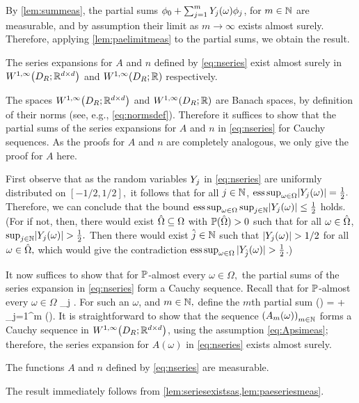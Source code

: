 By \cref{lem:summeas}, the partial sums $\phi_0 + \sum_{j=1}^m Y_{j}(\omega)\phi_j$, for $m \in \mathbb N$ are measurable, and by assumption their limit as $m \rightarrow \infty$ exists almost surely. Therefore, applying \cref{lem:paelimitmeas} to the partial sums, we obtain the result.
\epf

\ble\label{lem:seriesexistsas}
The series expansions for $A$ and $n$ defined by \eqref{eq:nseries} exist almost surely in $\WoiDRRRdtd$ and $\WoiDRRR$ respectively.
\ele

The spaces $\WoiDRRRdtd$ and $\WoiDRRR$ are Banach spaces, by definition of their norms (see, e.g., \eqref{eq:normsdef}). Therefore it suffices to show that the partial sums of the series expansions for $A$ and $n$ in \eqref{eq:nseries} for Cauchy sequences. As the proofs for $A$ and $n$ are completely analogous, we only give the proof for $A$ here.

First observe that as the random variables $Y_{j}$ in \eqref{eq:nseries} are uniformly distributed on $[-1/2,1/2],$ it follows that for all $j \in \mathbb N$, $\esssup_{\omega \in \Omega} \abs{\Yj(\omega)} = \frac12.$
Therefore, we can conclude that the bound $\esssup_{\omega \in \Omega} \sup_{j \in \NN} \abs{\Yj(\omega)} \leq \half$ holds.
(For if not, then, there would exist $\hat{\Omega} \subseteq \Omega$ with $\mathbb P(\hat{\Omega}) > 0$ such that for all $\omega \in \hat{\Omega}$, $\sup_{j \in \NN} \abs{\Yj(\omega)} > \half.$
Then there would exist $\hat{j} \in \mathbb N$ such that $\abs{\Yj(\omega)} > 1/2$ for all $\omega \in \hat{\Omega},$ which would give the contradiction $\operatorname{ess\,sup}_{\omega \in \Omega} |Y_{\hat{j}}(\omega)| > \frac{1}{2}$.)

It now suffices to show that for $\mathbb P$-almost every $\omega \in \Omega,$ the partial sums of the series expansion in \eqref{eq:nseries} form a Cauchy sequence. Recall that for $\mathbb P$-almost every $\omega \in \Omega$
\beqs
\sup_{j \in \NN} \abs{\Yj(\omega)} \leq \half.
\eeqs
For such an $\omega$, and $m \in \mathbb N,$ define the $m$th partial sum
\beqs
\Am(\omega) = \Az + \sum_{j=1}^m \Yj(\omega)\Psij.
\eeqs
It is straightforward to show that the sequence $\mleft(\Am(\omega)\mright)_{m \in \NN}$ forms a Cauchy sequence in $\WoiDRRRdtd$, using the assumption \eqref{eq:Apsimeas}; therefore, the series expansion for $A(\omega)$ in \eqref{eq:nseries} exists almost surely.
\epf

\ble\label{lem:seriesmeas}
The functions $A$ and $n$ defined by \eqref{eq:nseries} are measurable.
\ele

The result immediately follows from \cref{lem:seriesexistsas,lem:paeseriesmeas}.
\epf
